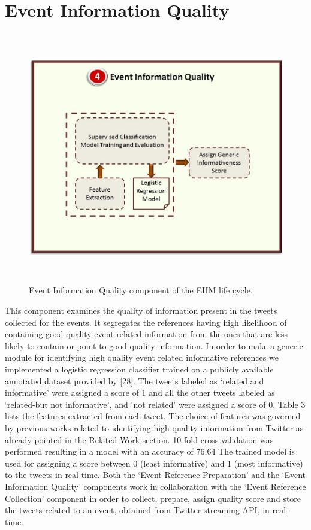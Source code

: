 \section{Event Information Quality}

\begin{figure}[htbp]
  \caption{Event Information Quality component of the EIIM life cycle.}
  \centering
    \includegraphics[width=14cm,height=11cm]{Figures/EIIMComponents/EventInformationQuality.jpg}
\end{figure}

This component examines the quality of information present in the tweets collected for the events. It segregates the references having high likelihood of containing good quality event related information from the ones that are less likely to contain or point to good quality information. In order to make a generic module for identifying high quality event related informative references we implemented a logistic regression classifier trained on a publicly available annotated dataset provided by [28]. The tweets labeled as ‘related and informative’ were assigned a score of 1 and all the other tweets labeled as ‘related-but not informative’, and ‘not related’ were assigned a score of 0. Table 3 lists the features extracted from each tweet. The choice of features was governed by previous works related to identifying high quality information from Twitter as already pointed in the Related Work section. 10-fold cross validation was performed resulting in a model with an accuracy of 76.64%
The trained model is used for assigning a score between 0 (least informative) and 1 (most informative) to the tweets in real-time. Both the ‘Event Reference Preparation’ and the ‘Event Information Quality’ components work in collaboration with the ‘Event Reference Collection’ component in order to collect, prepare, assign quality score and store the tweets related to an event, obtained from Twitter streaming API, in real-time.

